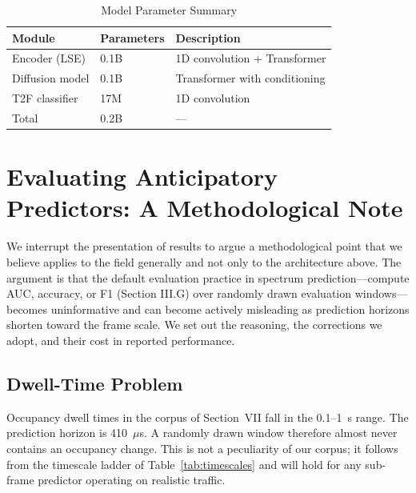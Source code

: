 \documentclass[lettersize,journal]{IEEEtran}
\newcommand{\us}{\ensuremath{\mu}s}
\begin{document}
\begin{table}[!t]
\centering
\caption{Model Parameter Summary}
\label{tab:params}
\renewcommand{\arraystretch}{1.2}
\begin{tabular}{@{}lll@{}}
\toprule
\textbf{Module} & \textbf{Parameters} & \textbf{Description} \\
\midrule
Encoder (LSE)   & 0.1B & 1D convolution + Transformer \\
Diffusion model & 0.1B & Transformer with conditioning \\
T2F classifier  & 17M  & 1D convolution \\
\midrule
Total           & 0.2B & --- \\
\bottomrule
\end{tabular}
\end{table}

\section{\textbf{Evaluating Anticipatory Predictors: A Methodological Note}}

We interrupt the presentation of results to argue a methodological point
that we believe applies to the field generally and not only to the
architecture above. The argument is that the default evaluation practice
in spectrum prediction---compute AUC, accuracy, or F1 (Section III.G) over randomly drawn
evaluation windows---becomes uninformative and can become actively
misleading as prediction horizons shorten toward the frame scale. We set
out the reasoning, the corrections we adopt, and their cost in reported
performance.

\subsection{\textbf{Dwell-Time Problem}}
Occupancy dwell times in the corpus of Section~VII fall in the 0.1--1~s
range. The prediction horizon is 410~\us. A randomly drawn window
therefore almost never contains an occupancy change. This is not a
peculiarity of our corpus; it follows from the timescale ladder of
Table~\ref{tab:timescales} and will hold for any sub-frame predictor
operating on realistic traffic.
\end{document}
